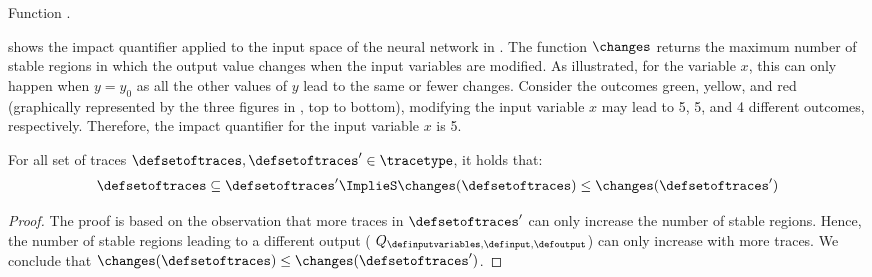 \begin{marginfigure}
    \caption{Function \changesname.}
  \end{marginfigure}

\begin{example}
   shows the \changesname{} impact quantifier applied to the input space of the neural network in .
  The function $\changes$ returns the maximum number of stable regions in which the output value changes when the input variables are modified.
  As illustrated, for the variable $x$, this can only happen when $y=y_0$ as all the other values of $y$ lead to the same or fewer changes.
  Consider the outcomes green, yellow, and red (graphically represented by the three figures in , top to bottom), modifying the input variable $x$ may lead to 5, 5, and 4 different outcomes, respectively.
  Therefore, the \changesname{} impact quantifier for the input variable $x$ is 5.
\end{example}


\begin{lemma}
For all set of traces $\defsetoftraces, \defsetoftraces'\in\tracetype$, it holds that:
  \begin{align*}
    \defsetoftraces \subseteq \defsetoftraces' \ImplieS \changes(\defsetoftraces) \le \changes(\defsetoftraces')
  \end{align*}
\end{lemma}
\begin{proof}
  The proof is based on the observation that more traces in $\defsetoftraces'$ can only increase the number of stable regions.
  Hence, the number of stable regions leading to a different output (\cf{} $Q_{\definputvariables, \definput, \defoutput}$) can only increase with more traces.
  We conclude that $\changes(\defsetoftraces) \le \changes(\defsetoftraces')$.
\end{proof}

